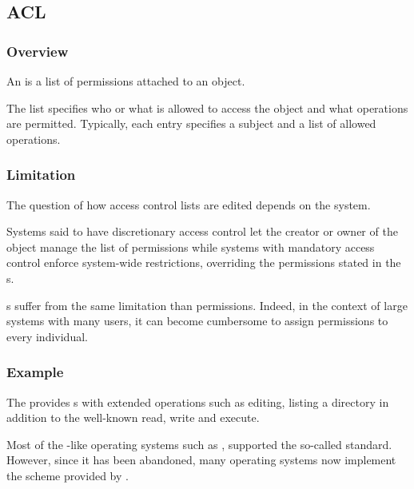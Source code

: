 
\subsection{ACL}


\begin{frame}
  \frametitle{Overview}

  An  is a list of permissions
  attached to an object.

  \-

  The list specifies who or what is allowed to access the object and what
  operations are permitted. Typically, each  entry specifies a
  subject and a list of allowed operations.
\end{frame}


\begin{frame}
  \frametitle{Limitation}

  The question of how access control lists are edited depends on the system.

  \-

  Systems said to have discretionary access control let the creator or owner
  of the object manage the list of permissions while systems with mandatory
  access control enforce system-wide restrictions, overriding the permissions
  stated in the s.

  \-

  s suffer from the same limitation than  permissions.
  Indeed, in the context of large systems with many users, it can become
  cumbersome to assign permissions to every individual.
\end{frame}


\begin{frame}
  \frametitle{Example}

  The  provides s with extended
  operations such as editing, listing a directory \etc{} in addition to the
  well-known read, write and execute.

  \-

  Most of the -like operating systems such as ,
   \etc{} supported the so-called  standard.
  However, since it has been abandoned, many operating systems now implement
  the  scheme provided by  .
\end{frame}


